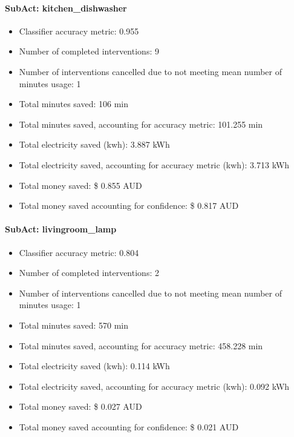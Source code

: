 \documentclass[11pt,]{article}
\providecommand{\tightlist}{%
  \setlength{\itemsep}{0pt}\setlength{\parskip}{0pt}}
\let\oldparagraph\paragraph
\renewcommand{\paragraph}[1]{\oldparagraph{#1}\mbox{}}
\begin{document}
\hypertarget{subact-kitchen_dishwasher}{%
\paragraph{SubAct:
kitchen\_dishwasher}\label{subact-kitchen_dishwasher}}

\begin{itemize}
\tightlist
\item
  Classifier accuracy metric: 0.955
\item
  Number of completed interventions: 9
\item
  Number of interventions cancelled due to not meeting mean number of
  minutes usage: 1
\item
  Total minutes saved: 106 min
\item
  Total minutes saved, accounting for accuracy metric: 101.255 min
\item
  Total electricity saved (kwh): 3.887 kWh
\item
  Total electricity saved, accounting for accuracy metric (kwh): 3.713
  kWh
\item
  Total money saved: \$ 0.855 AUD
\item
  Total money saved accounting for confidence: \$ 0.817 AUD
\end{itemize}

\hypertarget{subact-livingroom_lamp}{%
\paragraph{SubAct: livingroom\_lamp}\label{subact-livingroom_lamp}}

\begin{itemize}
\tightlist
\item
  Classifier accuracy metric: 0.804
\item
  Number of completed interventions: 2
\item
  Number of interventions cancelled due to not meeting mean number of
  minutes usage: 1
\item
  Total minutes saved: 570 min
\item
  Total minutes saved, accounting for accuracy metric: 458.228 min
\item
  Total electricity saved (kwh): 0.114 kWh
\item
  Total electricity saved, accounting for accuracy metric (kwh): 0.092
  kWh
\item
  Total money saved: \$ 0.027 AUD
\item
  Total money saved accounting for confidence: \$ 0.021 AUD
\end{itemize}
\end{document}
